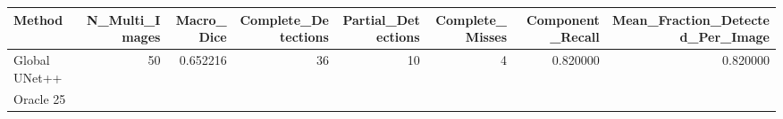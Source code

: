 \begin{tabular}{lrrrrrrr}
\toprule
Method & N_Multi_Images & Macro_Dice & Complete_Detections & Partial_Detections & Complete_Misses & Component_Recall & Mean_Fraction_Detected_Per_Image \\
\midrule
Global UNet++ & 50 & 0.652216 & 36 & 10 & 4 & 0.820000 & 0.820000 \\
Oracle 25%
\bottomrule
\end{tabular}
